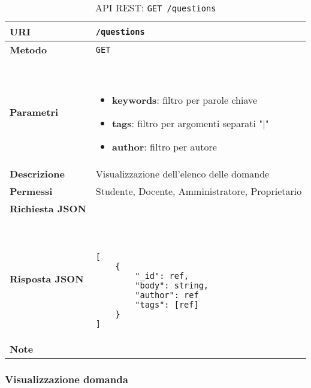         \begin{table}[H]
            \begin{center}
                \begin{tabular}{p{} p{}}
                    \toprule
                    \textbf{URI} & \texttt{/questions} \\ \midrule
                    \textbf{Metodo} & \texttt{GET} \\ \midrule
                    \textbf{Parametri} & \
                        \begin{itemize}
                            \item \textbf{keywords}: filtro per parole chiave
                            \item \textbf{tags}: filtro per argomenti separati "|" 
                            \item \textbf{author}: filtro per autore
                        \end{itemize}
                        \\ \midrule
                    \textbf{Descrizione} & Visualizzazione dell'elenco delle domande \\ \midrule
                    \textbf{Permessi} & Studente, Docente, Amministratore, Proprietario  \\ \midrule
                    \textbf{Richiesta JSON} & \\ \midrule
                    \textbf{Risposta JSON} & \
                        \begin{lstlisting}[basicstyle={\ttfamily}]
[
    {
        "_id": ref,
        "body": string,
        "author": ref
        "tags": [ref]
    }
]
                        \end{lstlisting}
                        \\ \midrule
                    \textbf{Note} & \\
                    \bottomrule
                \end{tabular}
                \caption{API REST: \texttt{GET /questions}}
            \end{center}
        \end{table}

    \subsubsection{Visualizzazione domanda}

